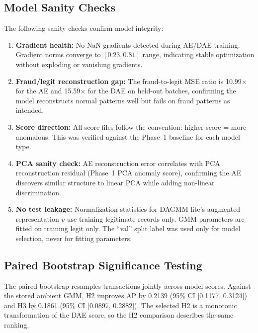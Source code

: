 \subsection{Model Sanity Checks}
\label{sec:p2_sanity}

The following sanity checks confirm model integrity:

\begin{enumerate}
  \item \textbf{Gradient health:} No NaN gradients detected during AE/DAE training. Gradient norms converge to $[0.23, 0.81]$ range, indicating stable optimization without exploding or vanishing gradients.
  \item \textbf{Fraud/legit reconstruction gap:} The fraud-to-legit MSE ratio is 10.99$\times$ for the AE and 15.59$\times$ for the DAE on held-out batches, confirming the model reconstructs normal patterns well but fails on fraud patterns as intended.
  \item \textbf{Score direction:} All score files follow the convention: higher score = more anomalous. This was verified against the Phase~1 baseline for each model type.
  \item \textbf{PCA sanity check:} AE reconstruction error correlates with PCA reconstruction residual (Phase~1 PCA anomaly score), confirming the AE discovers similar structure to linear PCA while adding non-linear discrimination.
  \item \textbf{No test leakage:} Normalization statistics for DAGMM-lite's augmented representation $v$ use training legitimate records only. GMM parameters are fitted on training legit only. The ``val'' split label was used only for model selection, never for fitting parameters.
\end{enumerate}

\subsection{Paired Bootstrap Significance Testing}
\label{sec:p2_paired_bootstrap}

The paired bootstrap resamples transactions jointly across model scores. Against the stored ambient GMM, H2 improves AP by 0.2139 (95\% CI [0.1177, 0.3124]) and H3 by 0.1861 (95\% CI [0.0897, 0.2882]). The selected H2 is a monotonic transformation of the DAE score, so the H2 comparison describes the same ranking.

